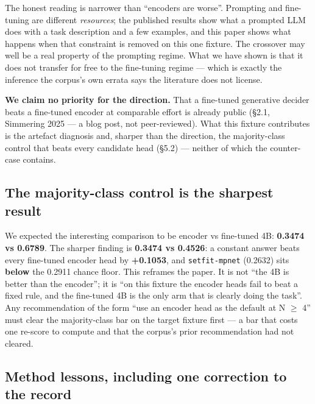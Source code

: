 \documentclass[11pt,a4paper]{article}
\begin{document}
The honest reading is narrower than ``encoders are worse''. Prompting and fine-tuning are different \emph{resources}; the published results show what a prompted LLM does with a task description and a few examples, and this paper shows what happens when that constraint is removed on this one fixture. The crossover may well be a real property of the prompting regime. What we have shown is that it does not transfer for free to the fine-tuning regime --- which is exactly the inference the corpus's own errata says the literature does not license.

\textbf{We claim no priority for the direction.} That a fine-tuned generative decider beats a fine-tuned encoder at comparable effort is already public (\S2.1, Simmering 2025 --- a blog post, not peer-reviewed). What this fixture contributes is the artefact diagnosis and, sharper than the direction, the majority-class control that beats every candidate head (\S5.2) --- neither of which the counter-case contains.

\subsection{The majority-class control is the sharpest result}

We expected the interesting comparison to be encoder vs fine-tuned 4B: \textbf{0.3474 vs 0.6789}. The sharper finding is \textbf{0.3474 vs 0.4526}: a constant answer beats every fine-tuned encoder head by \textbf{+0.1053}, and \texttt{setfit-mpnet} (0.2632) sits \textbf{below} the 0.2911 chance floor. This reframes the paper. It is not ``the 4B is better than the encoder''; it is ``on this fixture the encoder heads fail to beat a fixed rule, and the fine-tuned 4B is the only arm that is clearly doing the task''. Any recommendation of the form ``use an encoder head as the default at N $\ge$ 4'' must clear the majority-class bar on the target fixture first --- a bar that costs one re-score to compute and that the corpus's prior recommendation had not cleared.

\subsection{Method lessons, including one correction to the record}
\end{document}
